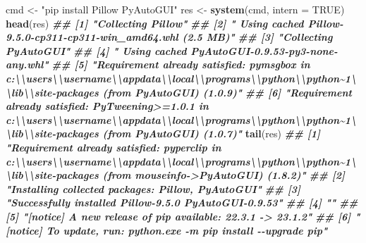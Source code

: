 \documentclass[
]{article}
\newenvironment{Shaded}{\begin{snugshade}}{\end{snugshade}}
\newcommand{\AttributeTok}[1]{\textcolor[rgb]{0.13,0.29,0.53}{#1}}
\newcommand{\ConstantTok}[1]{\textcolor[rgb]{0.56,0.35,0.01}{#1}}
\newcommand{\DocumentationTok}[1]{\textcolor[rgb]{0.56,0.35,0.01}{\textbf{\textit{#1}}}}
\newcommand{\FunctionTok}[1]{\textcolor[rgb]{0.13,0.29,0.53}{\textbf{#1}}}
\newcommand{\NormalTok}[1]{#1}
\newcommand{\OtherTok}[1]{\textcolor[rgb]{0.56,0.35,0.01}{#1}}
\newcommand{\StringTok}[1]{\textcolor[rgb]{0.31,0.60,0.02}{#1}}
\begin{document}
\begin{Shaded}
\begin{Highlighting}[]
\NormalTok{cmd }\OtherTok{\textless{}{-}} \StringTok{"pip install Pillow PyAutoGUI"}
\NormalTok{res }\OtherTok{\textless{}{-}} \FunctionTok{system}\NormalTok{(cmd, }\AttributeTok{intern =} \ConstantTok{TRUE}\NormalTok{)}
\FunctionTok{head}\NormalTok{(res)}
\DocumentationTok{\#\# [1] "Collecting Pillow"}
\DocumentationTok{\#\# [2] "  Using cached Pillow{-}9.5.0{-}cp311{-}cp311{-}win\_amd64.whl (2.5 MB)"}
\DocumentationTok{\#\# [3] "Collecting PyAutoGUI"}
\DocumentationTok{\#\# [4] "  Using cached PyAutoGUI{-}0.9.53{-}py3{-}none{-}any.whl"}
\DocumentationTok{\#\# [5] "Requirement already satisfied: pymsgbox in c:\textbackslash{}\textbackslash{}users\textbackslash{}\textbackslash{}username\textbackslash{}\textbackslash{}appdata\textbackslash{}\textbackslash{}local\textbackslash{}\textbackslash{}programs\textbackslash{}\textbackslash{}python\textbackslash{}\textbackslash{}python\textasciitilde{}1\textbackslash{}\textbackslash{}lib\textbackslash{}\textbackslash{}site{-}packages (from PyAutoGUI) (1.0.9)"}
\DocumentationTok{\#\# [6] "Requirement already satisfied: PyTweening\textgreater{}=1.0.1 in c:\textbackslash{}\textbackslash{}users\textbackslash{}\textbackslash{}username\textbackslash{}\textbackslash{}appdata\textbackslash{}\textbackslash{}local\textbackslash{}\textbackslash{}programs\textbackslash{}\textbackslash{}python\textbackslash{}\textbackslash{}python\textasciitilde{}1\textbackslash{}\textbackslash{}lib\textbackslash{}\textbackslash{}site{-}packages (from PyAutoGUI) (1.0.7)"}
\FunctionTok{tail}\NormalTok{(res)}
\DocumentationTok{\#\# [1] "Requirement already satisfied: pyperclip in c:\textbackslash{}\textbackslash{}users\textbackslash{}\textbackslash{}username\textbackslash{}\textbackslash{}appdata\textbackslash{}\textbackslash{}local\textbackslash{}\textbackslash{}programs\textbackslash{}\textbackslash{}python\textbackslash{}\textbackslash{}python\textasciitilde{}1\textbackslash{}\textbackslash{}lib\textbackslash{}\textbackslash{}site{-}packages (from mouseinfo{-}\textgreater{}PyAutoGUI) (1.8.2)"}
\DocumentationTok{\#\# [2] "Installing collected packages: Pillow, PyAutoGUI"}
\DocumentationTok{\#\# [3] "Successfully installed Pillow{-}9.5.0 PyAutoGUI{-}0.9.53"}
\DocumentationTok{\#\# [4] ""}
\DocumentationTok{\#\# [5] "[notice] A new release of pip available: 22.3.1 {-}\textgreater{} 23.1.2"}
\DocumentationTok{\#\# [6] "[notice] To update, run: python.exe {-}m pip install {-}{-}upgrade pip"}
\end{Highlighting}
\end{Shaded}
\end{document}
